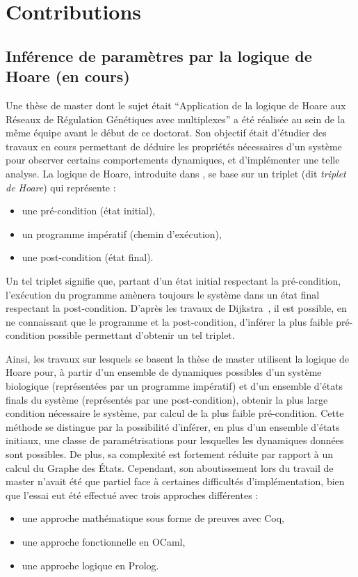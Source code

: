 \chapter{Contributions}

\section{Inférence de paramètres par la logique de Hoare \normalsize(en cours)}
\label{sec:hoare}

Une thèse de master \cite{Folschette2011} dont le sujet était “Application de la logique de Hoare aux Réseaux de Régulation Génétiques avec multiplexes” a été réalisée au sein de la même équipe avant le début de ce doctorat.
Son objectif était d'étudier des travaux en cours permettant de déduire les propriétés nécessaires d'un système pour observer certains comportements dynamiques, et d'implémenter une telle analyse.
La logique de Hoare, introduite dans \cite{hoare-69}, se base sur un triplet (dit \emph{triplet de Hoare}) qui représente :
\begin{itemize}
  \item une pré-condition (état initial),
  \item un programme impératif (chemin d'exécution),
  \item une post-condition (état final).
\end{itemize}
Un tel triplet signifie que, partant d'un état initial respectant la pré-condition, l'exécution du programme amènera toujours le système dans un état final respectant la post-condition.
D'après les travaux de Dijkstra~\cite{dijkstra-75}, il est possible, en ne connaissant que le programme et la post-condition,
d'inférer la plus faible pré-condition possible permettant d'obtenir un tel triplet.

Ainsi, les travaux sur lesquels se basent la thèse de master utilisent la logique de Hoare pour,
à partir d'un ensemble de dynamiques possibles d'un système biologique (représentées par un programme impératif)
et d'un ensemble d'états finals du système (représentés par une post-condition),
obtenir la plus large condition nécessaire le système, par calcul de la plus faible pré-condition.
Cette méthode se distingue par la possibilité d'inférer, en plus d'un ensemble d'états initiaux, une classe de paramétrisations pour lesquelles les dynamiques données sont possibles.
De plus, sa complexité est fortement réduite par rapport à un calcul du Graphe des États.
Cependant, son aboutissement lors du travail de master n'avait été que partiel face à certaines difficultés d'implémentation, bien que l'essai eut été effectué avec trois approches différentes :
\begin{itemize}
  \item une approche mathématique sous forme de preuves avec Coq,
  \item une approche fonctionnelle en OCaml,
  \item une approche logique en Prolog.
\end{itemize}

